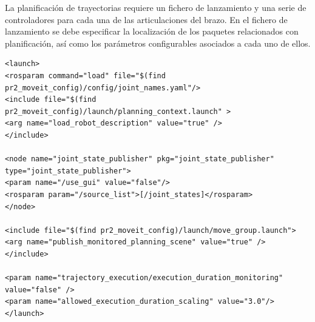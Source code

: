 \documentclass[12pt,spanish,chapterprefix, numbers=noenddot]{book}
\numberwithin{equation}{section}
\numberwithin{figure}{section}
\begin{document}
La planificación de trayectorias requiere un fichero de lanzamiento y una serie de controladores para cada una de las articulaciones del brazo. 
En el fichero de lanzamiento se debe especificar la localización de los paquetes relacionados con planificación, así como los parámetros configurables asociados a cada uno de ellos. 
\vspace{20pt}
	\begin{lstlisting}[frame=single] 
<launch>
<rosparam command="load" file="$(find pr2_moveit_config)/config/joint_names.yaml"/>
<include file="$(find pr2_moveit_config)/launch/planning_context.launch" >
<arg name="load_robot_description" value="true" />
</include>

<node name="joint_state_publisher" pkg="joint_state_publisher" type="joint_state_publisher">
<param name="/use_gui" value="false"/>
<rosparam param="/source_list">[/joint_states]</rosparam>
</node>

<include file="$(find pr2_moveit_config)/launch/move_group.launch">
<arg name="publish_monitored_planning_scene" value="true" />
</include>

<param name="trajectory_execution/execution_duration_monitoring" value="false" />
<param name="allowed_execution_duration_scaling" value="3.0"/>
</launch>
    \end{lstlisting}
\end{document}
